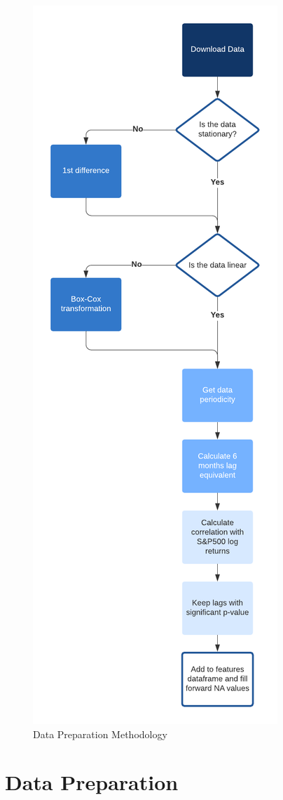 \documentclass[]{book}
\begin{document}
\begin{figure}
\includegraphics[width=0.6\linewidth]{data/data preparation} \caption{Data Preparation Methodology}\label{fig:unnamed-chunk-1}
\end{figure}

\hypertarget{data}{%
\chapter{Data Preparation}\label{data}}
\end{document}
